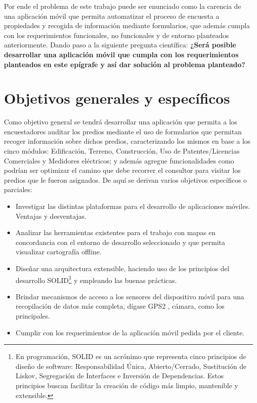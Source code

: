 Por ende el problema de este trabajo puede ser enunciado como la carencia de una
aplicación móvil que permita automatizar el proceso de encuesta a propiedades y
recogida de información mediante formularios, que además cumpla con los
requerimientos funcionales, no funcionales y de entorno planteados anteriormente.
Dando paso a la siguiente pregunta científica:
\textbf{¿Será posible desarrollar una aplicación móvil que cumpla con los requerimientos
      planteados en este epígrafe y así dar solución al problema planteado?}




\section{Objetivos generales y específicos} \label{section:objetivosGeneralesYEspecificos}
Como objetivo general se tendrá desarrollar una aplicación que permita a los
encuestadores auditar los predios mediante el uso de formularios que permitan
recoger información sobre dichos predios, caracterizando los mismos en base a los
cinco módulos: Edificación, Terreno, Construcción, Uso de Patentes/Licencias
Comerciales y Medidores eléctricos; y además agregue funcionalidades como
podrían ser optimizar el camino que debe recorrer el consultor para visitar los
predios que le fueron asignados. De aquí se derivan varios objetivos específicos o
parciales:
\begin{itemize}
      \item Investigar las distintas plataformas para el desarrollo de aplicaciones móviles.
            Ventajas y desventajas.
      \item Analizar las herramientas existentes para el trabajo con mapas en
            concordancia con el entorno de desarrollo seleccionado y que permita
            visualizar cartografía offline.
      \item Diseñar una arquitectura extensible, haciendo uso de los principios del
            desarrollo SOLID\footnote{En programación, SOLID es un acrónimo que representa cinco principios de diseño de software: Responsabilidad Única, Abierto/Cerrado, Sustitución de Liskov, Segregación de Interfaces e Inversión de Dependencias. Estos principios buscan facilitar la creación de código más limpio, mantenible y extensible. } y empleando las buenas prácticas.
      \item Brindar mecanismos de acceso a los sensores del dispositivo móvil para una
            recopilación de datos más completa, dígase GPS2
            , cámara, como los
            principales.
      \item Cumplir con los requerimientos de la aplicación móvil pedida por el
            cliente.
\end{itemize}

